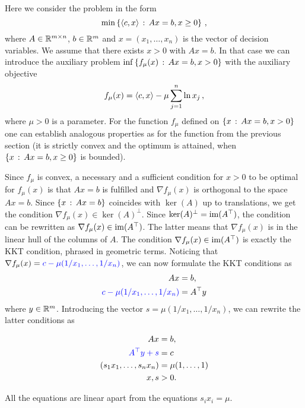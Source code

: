 Here we consider the problem in the form 
\[
	\min \left\{ \left\langle c , x \right\rangle \,:\, A x = b, x \ge 0 \right\} \,,
\]
where $A \in \mathbb{R}^{m \times n}$, $b \in \mathbb{R}^m$ and $x=(x_1,\ldots,x_n)$ is the vector of decision variables.
We assume that there exists $x > 0$ with $A x =b$. In that case we can introduce the auxiliary  problem $\inf \left\{ f_\mu(x) \,:\, A x= b, x > 0 \right\}$ with the auxiliary objective 
\[
	f_\mu(x) = \left\langle c , x \right\rangle - \mu \sum_{j=1}^n \ln x_j \,,
\]
where $\mu>0$ is a parameter. For the function $f_\mu$ defined on $\left\{ x \,:\, A x =b, x >0 \right\}$ one can establish analogous properties as for the function from the previous section (it is strictly convex and the optimum is attained, when $\left\{ x \,:\, A x=b,x \ge 0 \right\}$ is bounded). 

Since $f_\mu$ is convex, a necessary and a sufficient condition for $x >0$ to be optimal for $f_\mu(x)$ is that $Ax =b$ is fulfilled and $\nabla f_\mu(x)$ is orthogonal to the space $A x =b$. Since $\left\{ x \,:\, A x =b \right\}$ coincides with $\ker(A)$ up to translations, we get the condition $\nabla f_\mu(x) \in \ker(A)^\perp$. Since $\ker(A)^\perp = \operatorname{im}(A^\top)$, the condition can be rewritten as $\nabla f_\mu(x) \in \operatorname{im}(A^\top)$. The latter means that $\nabla f_\mu(x)$ is in the linear hull of the columns of $A$. The condition $\nabla f_\mu(x) \in \operatorname{im}(A^\top)$ is exactly the KKT condition, phrased in geometric terms. Noticing that $\nabla f_\mu(x) = \textcolor{blue}{c - \mu (1/x_1,\ldots,1/x_n)}$, we can now formulate the KKT conditions as
\begin{align*}
	A x & = b,
	\\ 	\textcolor{blue}{c - \mu (1/x_1,\ldots,1/x_n)} & = A^\top y
\end{align*}
where $y \in \mathbb{R}^m$. Introducing the vector $s= \mu (1/x_1,\ldots,1/x_n)$, we can rewrite the latter conditions as 

\begin{align}
	A x & = b, \label{primal:eq}
	\\ \textcolor{blue}{A^\top y + s} & = c \label{dual:eq}
	\\ (s_1 x_1,\ldots,s_n x_n) & = \mu (1,\ldots,1) \label{mu:slack}
	\\ x, s & > 0. \label{strict:pos}
\end{align}

All the equations are linear apart from the equations $s_i x_i = \mu$. 


